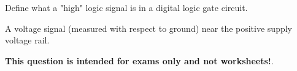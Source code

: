 

Define what a "high" logic signal is in a digital logic gate circuit.







A voltage signal (measured with respect to ground) near the positive supply voltage rail.







{\bf This question is intended for exams only and not worksheets!}.




